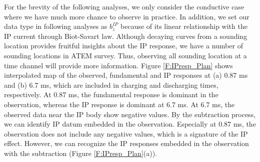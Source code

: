 \documentclass[a4paper, 11pt]{article}
\newcommand{\bzip}{b_z^{IP}}
\begin{document}
For the brevity of the following analyses, we only consider the conductive case where we have much more chance to observe in practice. 
In addition, we set our data type in following analyses as $\bzip$ because of its linear relationship with the IP current through Biot-Savart law. 
Although decaying curves from a sounding location provides fruitful insights about the IP response, we have a number of sounding locations in ATEM survey. 
Thus, observing all sounding location at a time channel will provide more information.  
Figure \ref{F:IPresp_Plan} shows interpolated map of the observed, fundamental and IP responses at (a) 0.87 ms and (b) 6.7 ms, which are included in charging and discharging times, respectively. 
At 0.87 ms, the fundamental response is dominant in the observation, whereas the IP response is dominant at 6.7 ms.
At 6.7 ms, the observed data near the IP body show negative values. 
By the subtraction process, we can identify IP datum embedded in the observation.
Especially at 0.87 ms, the observation does not include any negative values, which is a signature of the IP effect. 
However, we can recognize the IP responses embedded in the observation with the subtraction (Figure \ref{F:IPresp_Plan}(a)). 
\end{document}
